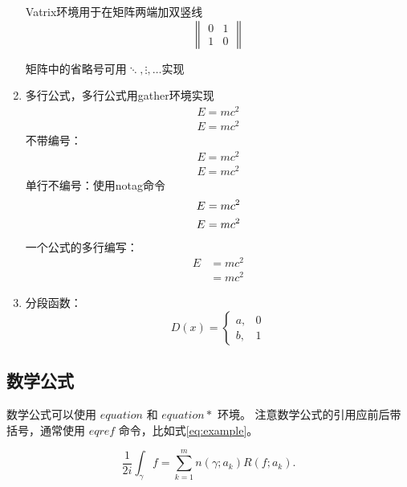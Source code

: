 \begin{enumerate}
	Vatrix环境用于在矩阵两端加双竖线
	\begin{equation*}
		\begin{Vmatrix}
			0 & 1 \\
			1 & 0
		\end{Vmatrix}
	\end{equation*}
	
	矩阵中的省略号可用$\ddots,\vdots,\dots$实现
	\iffalse
	矩阵
	&为列分隔符，\\为行分隔符
	\fi
	\item 多行公式，多行公式用gather环境实现
	\begin{gather}
		E=mc^2\\
		E=mc^2
	\end{gather}
	不带编号：
	\begin{gather*}
		E=mc^2\\
		E=mc^2
	\end{gather*}
	单行不编号：使用notag命令
	\begin{gather}
		E=mc^2 \notag \\
		E=mc^2
	\end{gather}
	一个公式的多行编写：
	\begin{equation}
		\begin{split}
			E & =mc^2  \\
			& =mc^2
		\end{split}
	\end{equation}
	\iffalse
	一个公式的多行编写:&为对齐位置
	\fi
	\item 分段函数：
	\begin{equation}
		D(x)=\begin{cases}
			a, &0 \\
			b, &1
		\end{cases}
	\end{equation} 
\end{enumerate}

\subsection{数学公式}

数学公式可以使用 ${equation}$ 和 ${equation*}$ 环境。
注意数学公式的引用应前后带括号，通常使用 ${eqref}$ 命令，比如式\ref{eq:example}。
\iffalse
eqref需要使用标签方式
\fi
\begin{equation}
	\frac{1}{2  i} \int_\gamma f = \sum_{k=1}^m n(\gamma; a_k) R(f; a_k).
	\label{eq:example}
\end{equation}

